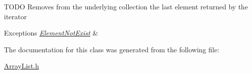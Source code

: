 T\-O\-D\-O Removes from the underlying collection the last element returned by the iterator 
\begin{DoxyExceptions}{Exceptions}
{\em \hyperlink{class_element_not_exist}{Element\-Not\-Exist}} & \\
\hline
\end{DoxyExceptions}


The documentation for this class was generated from the following file\-:\begin{DoxyCompactItemize}
\item 
\hyperlink{_array_list_8h}{Array\-List.\-h}\end{DoxyCompactItemize}
